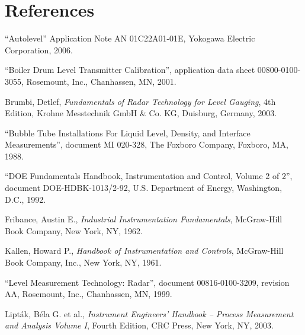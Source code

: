 \filbreak
\section*{References}


\noindent
``Autolevel'' Application Note AN 01C22A01-01E, Yokogawa Electric Corporation, 2006.

\vskip 10pt

\noindent
``Boiler Drum Level Transmitter Calibration'', application data sheet 00800-0100-3055, Rosemount, Inc., Chanhassen, MN, 2001.

\vskip 10pt

\noindent
Brumbi, Detlef, \textit{Fundamentals of Radar Technology for Level Gauging}, 4th Edition, Krohne Messtechnik GmbH \& Co. KG, Duisburg, Germany, 2003.

\vskip 10pt

\noindent
``Bubble Tube Installations For Liquid Level, Density, and Interface Measurements'', document MI 020-328, The Foxboro Company, Foxboro, MA, 1988.

\vskip 10pt

\noindent
``DOE Fundamentals Handbook, Instrumentation and Control, Volume 2 of 2'', document DOE-HDBK-1013/2-92, U.S. Department of Energy, Washington, D.C., 1992.

\vskip 10pt

\noindent
Fribance, Austin E., \textit{Industrial Instrumentation Fundamentals}, McGraw-Hill Book Company, New York, NY, 1962.

\vskip 10pt

\noindent
Kallen, Howard P., \textit{Handbook of Instrumentation and Controls}, McGraw-Hill Book Company, Inc., New York, NY, 1961.

\vskip 10pt

\noindent
``Level Measurement Technology: Radar'', document 00816-0100-3209, revision AA, Rosemount, Inc., Chanhassen, MN, 1999.

\vskip 10pt

\noindent
Lipt\'ak, B\'ela G. et al., \textit{Instrument Engineers' Handbook -- Process Measurement and Analysis Volume I}, Fourth Edition, CRC Press, New York, NY, 2003.

\vskip 10pt

